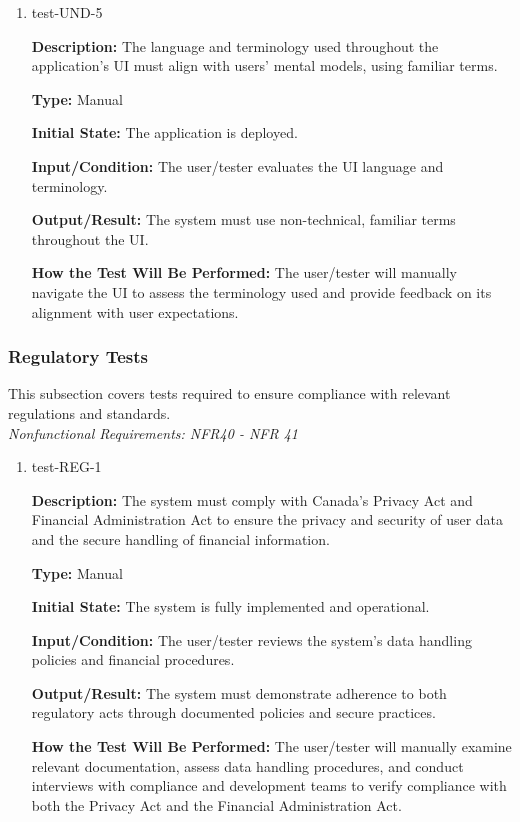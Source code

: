 \documentclass[12pt, titlepage]{article}
\begin{document}
\begin{enumerate}
\item{test-UND-5\\}

\textbf{Description:} The language and terminology used throughout the application’s UI must align with users’ mental models, using familiar terms.

\textbf{Type:} Manual
					
\textbf{Initial State:} The application is deployed.
					
\textbf{Input/Condition:} The user/tester evaluates the UI language and terminology.
					
\textbf{Output/Result:} The system must use non-technical, familiar terms throughout the UI.
					
\textbf{How the Test Will Be Performed:} The user/tester will manually navigate the UI to assess the terminology used and provide feedback on its alignment with user expectations.

\end{enumerate}

\subsubsection{Regulatory Tests}

This subsection covers tests required to ensure compliance with relevant regulations and standards. \\
\textit{Nonfunctional Requirements: NFR40 - NFR 41}

\begin{enumerate}

\item{test-REG-1\\}

\textbf{Description:} The system must comply with Canada’s Privacy Act and Financial Administration Act to ensure the privacy and security of user data and the secure handling of financial information.

\textbf{Type:} Manual
					
\textbf{Initial State:} The system is fully implemented and operational.
					
\textbf{Input/Condition:} The user/tester reviews the system’s data handling policies and financial procedures.
					
\textbf{Output/Result:} The system must demonstrate adherence to both regulatory acts through documented policies and secure practices.
					
\textbf{How the Test Will Be Performed:} The user/tester will manually examine relevant documentation, assess data handling procedures, and conduct interviews with compliance and development teams to verify compliance with both the Privacy Act and the Financial Administration Act.

\end{enumerate}
\end{document}
